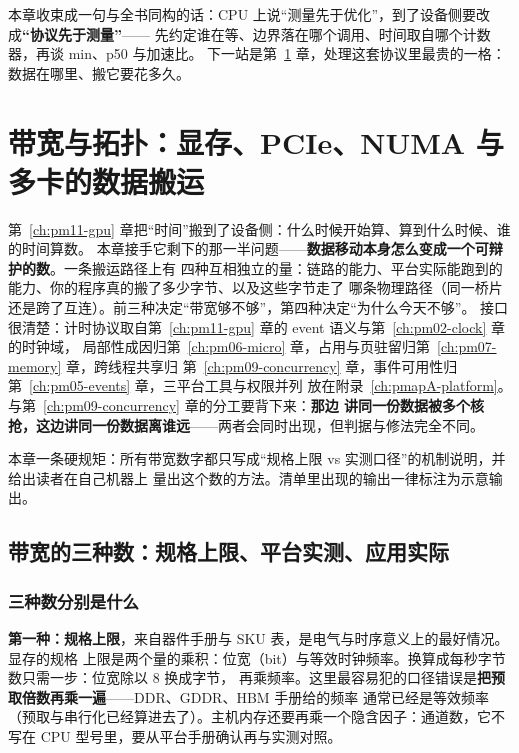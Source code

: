 \documentclass[12pt,a4paper,fontset=fandol]{ctexbook}
\newcommand{\Mx}[1]{\textsf{#1}}
\begin{document}
本章收束成一句与全书同构的话：CPU 上说``测量先于优化''，到了设备侧要改成\textbf{``协议先于测量''}——
先约定谁在等、边界落在哪个调用、时间取自哪个计数器，再谈 min、\Mx{p50} 与加速比。
下一站是第~\ref{ch:pm12-bandwidth} 章，处理这套协议里最贵的一格：数据在哪里、搬它要花多久。

\chapter{带宽与拓扑：显存、PCIe、NUMA 与多卡的数据搬运}
\label{ch:pm12-bandwidth}

第~\ref{ch:pm11-gpu} 章把``时间''搬到了设备侧：什么时候开始算、算到什么时候、谁的时间算数。
本章接手它剩下的那一半问题——\textbf{数据移动本身怎么变成一个可辩护的数}。一条搬运路径上有
四种互相独立的量：链路的能力、平台实际能跑到的能力、你的程序真的搬了多少字节、以及这些字节走了
哪条物理路径（同一桥片还是跨了互连）。前三种决定``带宽够不够''，第四种决定``为什么今天不够''。
接口很清楚：计时协议取自第~\ref{ch:pm11-gpu} 章的 event 语义与第~\ref{ch:pm02-clock} 章的时钟域，
局部性成因归第~\ref{ch:pm06-micro} 章，占用与页驻留归第~\ref{ch:pm07-memory} 章，跨线程共享归
第~\ref{ch:pm09-concurrency} 章，事件可用性归第~\ref{ch:pm05-events} 章，三平台工具与权限并列
放在附录~\ref{ch:pmapA-platform}。与第~\ref{ch:pm09-concurrency} 章的分工要背下来：\textbf{那边
讲同一份数据被多个核抢，这边讲同一份数据离谁远}——两者会同时出现，但判据与修法完全不同。

本章一条硬规矩：所有带宽数字都只写成``规格上限 vs 实测口径''的机制说明，并给出读者在自己机器上
量出这个数的方法。清单里出现的输出一律标注为示意输出。

\section{带宽的三种数：规格上限、平台实测、应用实际}
\label{sec:pm12-three-numbers}

\subsection*{三种数分别是什么}
\textbf{第一种：规格上限}，来自器件手册与 SKU 表，是电气与时序意义上的最好情况。显存的规格
上限是两个量的乘积：位宽（bit）与等效时钟频率。换算成每秒字节数只需一步：位宽除以 8 换成字节，
再乘频率。这里最容易犯的口径错误是\textbf{把预取倍数再乘一遍}——DDR、GDDR、HBM 手册给的频率
通常已经是等效频率（预取与串行化已经算进去了）。主机内存还要再乘一个隐含因子：通道数，它不写在
CPU 型号里，要从平台手册确认再与实测对照。
\end{document}
